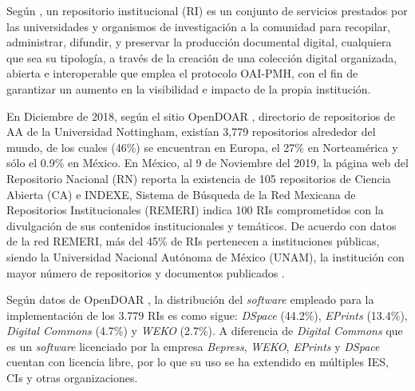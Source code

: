 Seg\'un \cite{EcosistemasdelAA}, un repositorio institucional (RI) es un conjunto de servicios prestados por las universidades y organismos de investigaci\'on a la   comunidad para recopilar, ad\-mi\-nis\-trar, difundir, y preservar la producci\'on documental digital, cualquiera que sea su tipolog\'ia, a trav\'es de la creaci\'on de una colecci\'on digital organizada, abierta e interoperable que emplea el protocolo OAI-PMH, con el fin de garantizar un aumento en la visibilidad e impacto de la propia instituci\'on. \newline

En Diciembre de 2018, seg\'un el sitio OpenDOAR \cite{OpenDOAR}, directorio de repositorios de AA de la Universidad Nottingham, exist\'ian 3,779 repositorios alrededor del mundo, de los cuales (46\%) se encuentran en Europa, el 27\% en Norteam\'erica y s\'olo el 0.9\% en M\'exico. En M\'exico, al 9 de Noviembre del 2019, la p\'agina web del Repositorio Nacional (RN) \cite{RepositorioNacional} reporta la existencia de 105 repositorios de Ciencia Abierta (CA) e INDEXE, Sistema de B\'usqueda de la Red Mexicana de Repositorios Institucionales (REMERI) \cite{RI_REMERI} indica 100 RIs comprometidos con la divulgaci\'on de sus contenidos institucionales y tem\'aticos. De acuerdo con datos de la red REMERI, 
m\'as del 45\% de RIs pertenecen a instituciones p\'ublicas, siendo la Universidad Nacional Aut\'onoma de M\'exico (UNAM), la instituci\'on con mayor n\'umero de repositorios y documentos publicados \cite{RI_REMERI}. \newline

Seg\'un datos de OpenDOAR \cite{OpenDOAR}, la distribuci\'on del \textit{software} empleado para la implementaci\'on de los 3.779 RIs es como sigue:  \textit{DSpace} \cite{DSpaceRef} (44.2\%), \textit{EPrints} (13.4\%), \textit{Digital Commons} (4.7\%) y \textit{WEKO} (2.7\%). A diferencia de \textit{Digital Commons} que es un \textit{software} licenciado por la empresa \textit{Bepress}, \textit{WEKO}, \textit{EPrints} y \textit{DSpace} cuentan con licencia libre, por lo que su uso se ha extendido en m\'ultiples IES, CIs y otras organizaciones.\newline


